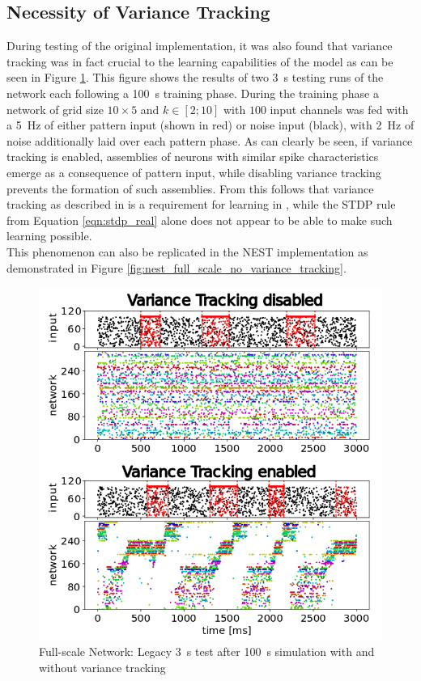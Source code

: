 \subsection{Necessity of Variance Tracking}
During testing of the original implementation, it was also found that variance tracking was in fact crucial to the learning capabilities of the model as can be seen in Figure \ref{fig:variance_tracking_comparison}. This figure shows the results of two \SI{3}{\second} testing runs of the network each following a \SI{100}{\second} training phase. During the training phase a network of grid size $10\times 5$ and $k\in[2; 10]$ with $100$ input channels was fed with a \SI{5}{\hertz} of either pattern input (shown in red) or noise input (black), with \SI{2}{\hertz} of noise additionally laid over each pattern phase. As can clearly be seen, if variance tracking is enabled, assemblies of neurons with similar spike characteristics emerge as a consequence of pattern input, while disabling variance tracking prevents the formation of such assemblies. From this follows that variance tracking as described in \parencite{nessler_et_al_2013} is a requirement for learning in \parencite{klampfl_maass_2013}, while the STDP rule from Equation \ref{eqn:stdp_real} alone does not appear to be able to make such learning possible.\\
This phenomenon can also be replicated in the NEST implementation as demonstrated in Figure \ref{fig:nest_full_scale_no_variance_tracking}.
\begin{figure}[htbp]
    \centering
    \includegraphics[width=0.8\columnwidth]{Figures/variance_tracking_comparison.png}
    \caption{Full-scale Network: Legacy \SI{3}{\second} test after \SI{100}{\second} simulation with and without variance tracking}
    \label{fig:variance_tracking_comparison}
\end{figure}
